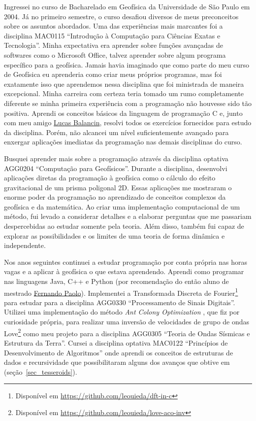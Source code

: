 \documentclass[12pt,a4paper,oneside]{book}
\newcommand{\USP}{Universidade de São Paulo}
\begin{document}
Ingressei no curso de Bacharelado em Geofísica da \USP{} em
2004.
Já no primeiro semestre, o curso desafiou diversos de meus preconceitos sobre
os assuntos abordados.
Uma das experiências mais marcantes foi a disciplina MAC0115 ``Introdução à
Computação para Ciências Exatas e Tecnologia''.
Minha expectativa era aprender sobre funções avançadas de softwares como o
Microsoft Office, talvez aprender sobre algum programa específico para a
geofísica.
Jamais havia imaginado que como parte do meu curso de Geofísica eu aprenderia
como criar meus próprios programas, mas foi exatamente isso que aprendemos
nessa disciplina que foi ministrada de maneira excepcional.
Minha carreira com certeza teria tomado um rumo completamente diferente se
minha primeira experiência com a programação não houvesse sido tão positiva.
Aprendi os conceitos básicos da linguagem de programação C e, junto com meu
amigo \href{https://www.linkedin.com/in/balancin/}{Lucas Balancin}, resolvi
todos os exercícios fornecidos para estudo da disciplina.
Porém, não alcancei um nível suficientemente avançado para enxergar aplicações
imediatas da programação nas demais disciplinas do curso.

Busquei aprender mais sobre a programação através da disciplina optativa
AGG0204 ``Computação para Geofísicos''.
Durante a disciplina, desenvolvi aplicações diretas da programação à geofísica
como o cálculo do efeito gravitacional de um prisma poligonal 2D.
Essas aplicações me mostraram o enorme poder da programação no aprendizado de
conceitos complexos da geofísica e da matemática.
Ao criar uma implementação computacional de um método, fui levado a considerar
detalhes e a elaborar perguntas que me passariam despercebidas ao estudar
somente pela teoria.
Além disso, também fui capaz de explorar as possibilidades e os limites de uma
teoria de forma dinâmica e independente.

Nos anos seguintes continuei a estudar programação por conta própria nas horas
vagas e a aplicar à geofísica o que estava aprendendo.
Aprendi como programar nas linguagens Java, C++ e Python (por recomendação do
então aluno de mestrado \href{https://www.linkedin.com/in/fspaolo/}{Fernando Paolo}).
Implementei a Transformada Discreta de Fourier\footnote{Disponível em
\url{https://github.com/leouieda/dft-in-c}} para estudar para a disciplina
AGG0330 ``Processamento de Sinais Digitais''.
Utilizei uma implementação do método \textit{Ant Colony Optimization}
\citep{Socha2008}, que fiz por curiosidade própria, para realizar uma inversão
de velocidades de grupo de ondas
Love\footnote{Disponível em \url{https://github.com/leouieda/love-aco-inv}}
como meu projeto para a disciplina AGG0305 ``Teoria de Ondas Sísmicas e
Estrutura da Terra''.
Cursei a disciplina optativa MAC0122 ``Princípios de Desenvolvimento de
Algoritmos'' onde aprendi os conceitos de estruturas de dados e recursividade
que possibilitaram alguns dos avanços que obtive em \citet{Uieda2016}
(seção~\ref{sec_tesseroids}).
\end{document}
